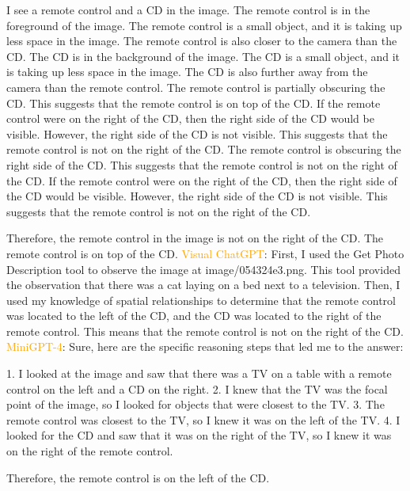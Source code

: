 \begin{enumerate}
    I see a remote control and a CD in the image.
    The remote control is in the foreground of the image. The remote control is a small object, and it is taking up less space in the image. The remote control is also closer to the camera than the CD.
    The CD is in the background of the image. The CD is a small object, and it is taking up less space in the image. The CD is also further away from the camera than the remote control.
    The remote control is partially obscuring the CD. This suggests that the remote control is on top of the CD.
    If the remote control were on the right of the CD, then the right side of the CD would be visible. However, the right side of the CD is not visible. This suggests that the remote control is not on the right of the CD.
    The remote control is obscuring the right side of the CD. This suggests that the remote control is not on the right of the CD. If the remote control were on the right of the CD, then the right side of the CD would be visible. However, the right side of the CD is not visible. This suggests that the remote control is not on the right of the CD.
    
    Therefore, the remote control in the image is not on the right of the CD. The remote control is on top of the CD.
    \subitem \textcolor{orange}{Visual ChatGPT}: First, I used the Get Photo Description tool to observe the image at image/054324e3.png. This tool provided the observation that there was a cat laying on a bed next to a television. Then, I used my knowledge of spatial relationships to determine that the remote control was located to the left of the CD, and the CD was located to the right of the remote control. This means that the remote control is not on the right of the CD.
    \subitem \textcolor{orange}{MiniGPT-4}: Sure, here are the specific reasoning steps that led me to the answer:

    1. I looked at the image and saw that there was a TV on a table with a remote control on the left and a CD on the right.
    2. I knew that the TV was the focal point of the image, so I looked for objects that were closest to the TV.
    3. The remote control was closest to the TV, so I knew it was on the left of the TV.
    4. I looked for the CD and saw that it was on the right of the TV, so I knew it was on the right of the remote control.
    
    Therefore, the remote control is on the left of the CD.
\end{enumerate}
